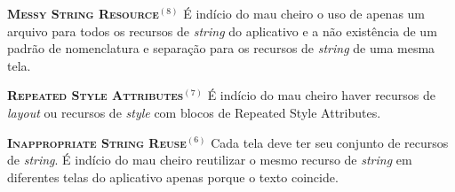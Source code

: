 
  \noindent
  \textbf{\textsc{{\small Messy String Resource}}}$^{(8)}$
      É indício do mau cheiro o uso de apenas um arquivo para todos os recursos de \textit{string} do aplicativo e a não existência de um padrão de nomenclatura e separação para os recursos de \textit{string} de uma mesma tela.


  \noindent
  \textbf{\textsc{{\small Repeated Style Attributes}}}$^{(7)}$
      É indício do mau cheiro haver recursos de \textit{layout} ou recursos de \textit{style} com blocos de Repeated Style Attributes.


  \noindent
  \textbf{\textsc{{\small Inappropriate String Reuse}}}$^{(6)}$
      Cada tela deve ter seu conjunto de recursos de \textit{string}. É indício do mau cheiro reutilizar o mesmo recurso de \textit{string} em diferentes telas do aplicativo apenas porque o texto coincide.


